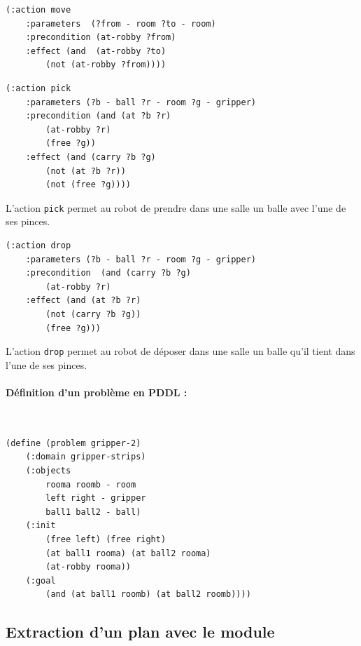 \begin{lstlisting}[language=pddl,frame=single]
(:action move
    :parameters  (?from - room ?to - room)
    :precondition (at-robby ?from)
    :effect (and  (at-robby ?to)
        (not (at-robby ?from))))
\end{lstlisting}

\begin{lstlisting}[language=pddl,frame=single]
(:action pick
    :parameters (?b - ball ?r - room ?g - gripper)
    :precondition (and (at ?b ?r)
        (at-robby ?r)
        (free ?g))
    :effect (and (carry ?b ?g)
        (not (at ?b ?r))
        (not (free ?g))))
\end{lstlisting}

L'action \texttt{pick} permet au robot de prendre dans une salle un balle avec l'une de ses pinces.

\begin{lstlisting}[language=pddl,frame=single]
(:action drop
    :parameters (?b - ball ?r - room ?g - gripper)
    :precondition  (and (carry ?b ?g)
        (at-robby ?r)
    :effect (and (at ?b ?r)
        (not (carry ?b ?g)) 
        (free ?g)))
\end{lstlisting}

L'action \texttt{drop} permet au robot de déposer dans une salle un balle qu'il tient dans l'une de ses pinces.


\paragraph{Définition d'un problème en PDDL :}~\\

\begin{lstlisting}[language=pddl,frame=single]
(define (problem gripper-2)
    (:domain gripper-strips)
    (:objects
        rooma roomb - room
        left right - gripper
        ball1 ball2 - ball)
    (:init
        (free left) (free right)
        (at ball1 rooma) (at ball2 rooma)
        (at-robby rooma))
    (:goal
        (and (at ball1 roomb) (at ball2 roomb))))
\end{lstlisting}


\subsection{Extraction d'un plan avec le module \touistplan}


